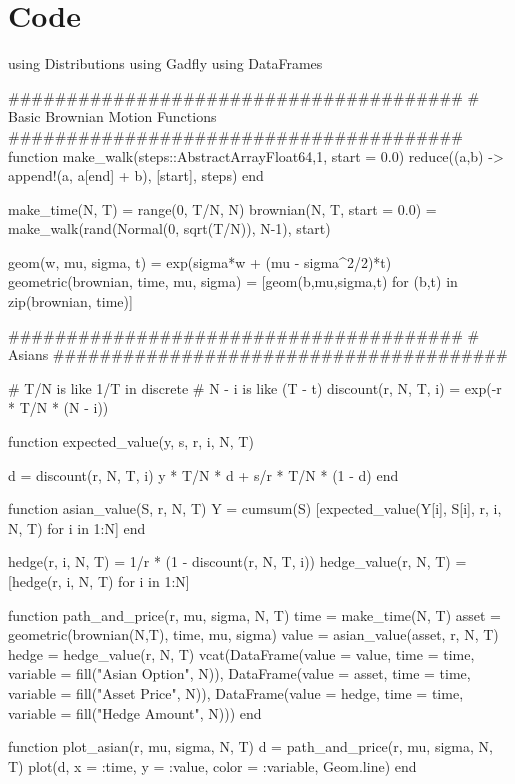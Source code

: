 \documentclass[a4paper,12pt]{article}
\begin{document}
\section{Code}

\begin{juliacode}
using Distributions
using Gadfly
using DataFrames

#######################################
# Basic Brownian Motion Functions
#######################################
function make_walk(steps::AbstractArray{Float64,1}, start = 0.0)
    reduce((a,b) -> append!(a, a[end] + b), [start], steps)
end

make_time(N, T) = range(0, T/N, N)
brownian(N, T, start = 0.0) = make_walk(rand(Normal(0, sqrt(T/N)), N-1), start)

geom(w, mu, sigma, t) = exp(sigma*w + (mu - sigma^2/2)*t)
geometric(brownian, time, mu, sigma) = [geom(b,mu,sigma,t) for (b,t) in zip(brownian, time)]

#######################################
# Asians
#######################################

# T/N is like 1/T in discrete
# N - i is like (T - t)
discount(r, N, T, i) = exp(-r * T/N * (N - i))

function expected_value(y, s, r, i, N, T)

    d = discount(r, N, T, i)
    y * T/N * d + s/r * T/N * (1 - d)
end

function asian_value(S, r, N, T)
    Y = cumsum(S)
    [expected_value(Y[i], S[i], r, i, N, T) for i in 1:N]
end

hedge(r, i, N, T) = 1/r * (1 - discount(r, N, T, i))
hedge_value(r, N, T) = [hedge(r, i, N, T) for i in 1:N]

function path_and_price(r, mu, sigma, N, T)
    time = make_time(N, T)
    asset = geometric(brownian(N,T), time, mu, sigma)
    value = asian_value(asset, r, N, T)
    hedge = hedge_value(r, N, T)
    vcat(DataFrame(value = value, time = time, variable = fill("Asian Option", N)),
         DataFrame(value = asset, time = time, variable = fill("Asset Price", N)),
         DataFrame(value = hedge, time = time, variable = fill("Hedge Amount", N)))
end

function plot_asian(r, mu, sigma, N, T)
    d = path_and_price(r, mu, sigma, N, T)
    plot(d, x = :time, y = :value, color = :variable, Geom.line)
end
\end{juliacode}
\end{document}
